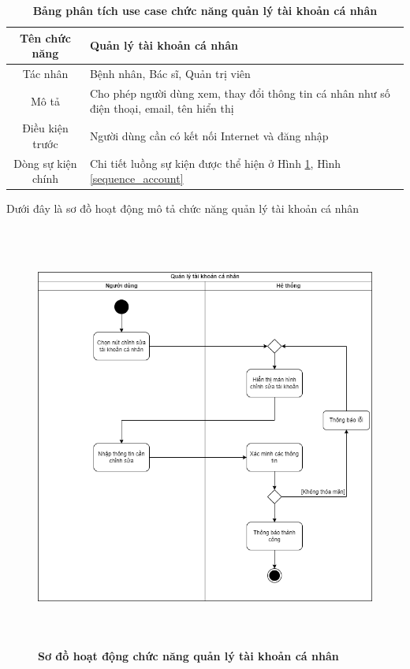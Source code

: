   \begin{table}[H]
    \caption{\bfseries \fontsize{12pt}{0pt}\selectfont Bảng phân tích use case chức năng quản lý tài khoản cá nhân}
    \centering
    \begin{tabularx}{0.9\textwidth}{|c|X|}
      \hline
      \textbf{Tên chức năng} & \textbf{Quản lý tài khoản cá nhân} \\
      \hline
      Tác nhân & Bệnh nhân, Bác sĩ, Quản trị viên \\
      \hline
      Mô tả & Cho phép người dùng xem, thay đổi thông tin cá nhân như số điện thoại, email, tên hiển thị
       \\
      \hline
      Điều kiện trước & Người dùng cần có kết nối Internet và đăng nhập \\
      \hline
      Dòng sự kiện chính & 
        Chi tiết luồng sự kiện được thể hiện ở Hình \ref{activity_manage_info}, Hình \ref{sequence_account} 
        \\
      \hline
    \end{tabularx}
  \end{table}
  Dưới đây là sơ đồ hoạt động mô tả chức năng quản lý tài khoản cá nhân
  \begin{figure}[H]
    \centering
    \includegraphics[width=13.5cm,height=14cm]{Images/activity/activity_manage_info.png}
    \caption[Sơ đồ hoạt động chức năng quản lý tài khoản cá nhân]{\bfseries \fontsize{12pt}{0pt}
    \selectfont Sơ đồ hoạt động chức năng quản lý tài khoản cá nhân}
    \label{activity_manage_info} %
  \end{figure}

